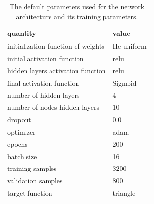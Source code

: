 \documentclass[prl,twocolumn]{revtex4-1}
\begin{document}
\begin{table}[!b]
\begin{center}
\begin{tabular}{ll}
quantity & value \\
\hline
initialization function of weights & He uniform\\ 
initial activation function & relu \\
hidden layers activation function & relu\\
final activation function & Sigmoid \\
number of hidden layers & $4$ \\
number of nodes hidden layers & $10$\\
dropout & $0.0$\\
optimizer & adam\\
epochs & $200$ \\
batch size & 16\\
training samples & 3200\\
validation samples & 800\\
target function & triangle
\end{tabular}
\end{center}
\caption{The default parameters used for the network architecture and its training parameters.}
\label{tab:optimal_value}
\end{table}
\end{document}
